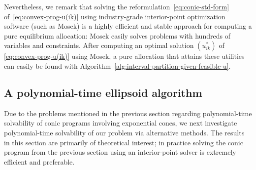 Nevertheless, we remark that solving the reformulation~\eqref{eq:conic-std-form} of~\eqref{eq:convex-prog-u(ik)} using industry-grade interior-point optimization software (such as Mosek) is a highly efficient and stable approach for computing a pure equilibrium allocation: Mosek easily solves problems with hundreds of variables and constraints.
After computing an optimal solution $(u^*_{ik})$ of \eqref{eq:convex-prog-u(ik)} using Mosek, a pure allocation that attains these utilities can easily be found with Algorithm~\ref{alg:interval-partition-given-feasible-u}. %

\subsection{A polynomial-time ellipsoid algorithm} \label{subsec:compute-pure-eq-alloc-poly-time}
Due to the problems mentioned in the previous section regarding polynomial-time solvability of conic programs involving exponential cones, we next investigate polynomial-time solvability of our problem via alternative methods.
The results in this section are primarily of theoretical interest; in practice solving the conic program from the previous section using an interior-point solver is extremely efficient and preferable.

